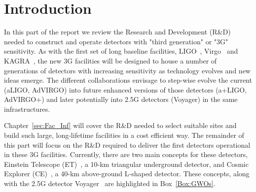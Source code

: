 \chapter{Introduction}
\label{sec:Intro}
\setcounter{page}{1}
\vspace{-1.5cm}
In this part of the report we review the Research and Development (R\&D) needed to construct and operate detectors with "third generation" or "3G" sensitivity. As with the first set of long baseline facilities, LIGO~\cite{AdvancedLIGO2015}, Virgo~\cite{AdvancedVirgo2015} and KAGRA~\cite{KAGRA2013}, the new 3G facilities will be designed to house a number of generations of detectors with increasing sensitivity as technology evolves and new ideas emerge.
The different collaborations envisage to step-wise evolve the current (aLIGO, AdVIRGO)\cite{AdvancedVirgo2015, AdvancedLIGO2015} into future enhanced versions of those detectors (a+LIGO, AdVIRGO+) \cite{Zucker:LIGOAplus, Cagnoli:VirgoAplus} and later potentially into 2.5G detectors (Voyager)\cite{VoyagerDCC2018} in the same infrastructures.

 Chapter~\ref{sec:Fac_Inf} will cover the R\&D needed to select suitable sites and build such large, long-lifetime facilities in a cost efficient way. The remainder of this part will focus on the R\&D required to deliver the first detectors operational in these 3G facilities.  Currently, there are two main concepts for these detectors, Einstein Telescope (ET)~\cite{ET2011}, a 10-km triangular underground detector, and Cosmic Explorer (CE)~\cite{CosmicExplorer2017}, a 40-km above-ground L-shaped detector. These concepts, along with the 2.5G detector Voyager~\cite{Voyager:Inst,VoyagerDCC2018} are highlighted in Box~\ref{Box:GWOs}.

